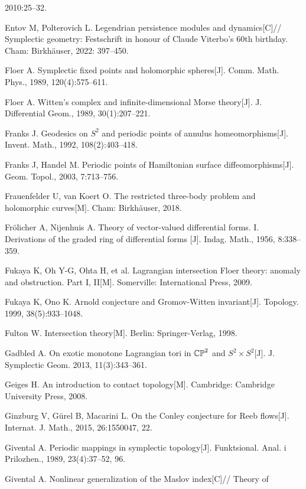 \begin{enumerate}[label={[\arabic*]},leftmargin=3.2em,itemsep=2pt,parsep=0pt]
        2010:25--32.
  \item Entov M, Polterovich L. Legendrian persistence modules and dynamics[C]//
        Symplectic geometry: Festschrift in honour of Claude Viterbo's 60th birthday.
        Cham: Birkhäuser, 2022: 397--450.
  \item Floer A. Symplectic fixed points and holomorphic spheres[J]. Comm. Math. Phys.,
        1989, 120(4):575--611.
  \item Floer A. Witten's complex and infinite-dimensional Morse theory[J].
        J. Differential Geom., 1989, 30(1):207--221.
  \item Franks J. Geodesics on $S^2$ and periodic points of annulus homeomorphisms[J].
        Invent. Math., 1992, 108(2):403--418.
  \item Franks J, Handel M. Periodic points of Hamiltonian surface diffeomorphisms[J].
        Geom. Topol., 2003, 7:713--756.
  \item Frauenfelder U, van Koert O. The restricted three-body problem and holomorphic
        curves[M]. Cham: Birkhäuser, 2018.
  \item Frölicher A, Nijenhuis A. Theory of vector-valued differential forms. I.
        Derivations of the graded ring of differential forms [J]. Indag. Math., 1956,
        8:338--359.
  \item Fukaya K, Oh Y-G, Ohta H, et al. Lagrangian intersection Floer theory: anomaly and
        obstruction. Part I, II[M]. Somerville: International Press, 2009.
  \item Fukaya K, Ono K. Arnold conjecture and Gromov-Witten invariant[J]. Topology. 1999,
        38(5):933--1048.
  \item Fulton W. Intersection theory[M]. Berlin: Springer-Verlag, 1998.
  \item Gadbled A. On exotic monotone Lagrangian tori in $\mathbb{CP}^2$ and $S^2\times S^2$[J].
        J. Symplectic Geom. 2013, 11(3):343--361.
  \item Geiges H. An introduction to contact topology[M]. Cambridge: Cambridge University
        Press, 2008.
  \item Ginzburg V, Gürel B, Macarini L. On the Conley conjecture for Reeb flows[J].
        Internat. J. Math., 2015, 26:1550047, 22.
  \item Givental A. Periodic mappings in symplectic topology[J]. Funktsional. Anal. i
        Prilozhen., 1989, 23(4):37--52, 96.
  \item Givental A. Nonlinear generalization of the Maslov index[C]// Theory of

\end{enumerate}
